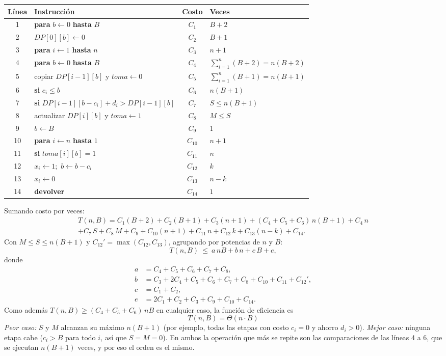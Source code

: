 \documentclass[11pt,a4paper]{article}
\theoremstyle{definition}
\begin{document}
\begin{center}
\small
\begin{tabular}{@{}clcl@{}}
\toprule
Línea & Instrucción & Costo & Veces\\
\midrule
1 & \textbf{para} $b\gets 0$ \textbf{hasta} $B$ & $C_1$ & $B+2$\\
2 & $DP[0][b]\gets 0$ & $C_2$ & $B+1$\\
3 & \textbf{para} $i\gets 1$ \textbf{hasta} $n$ & $C_3$ & $n+1$\\
4 & \textbf{para} $b\gets 0$ \textbf{hasta} $B$ & $C_4$ & $\sum_{i=1}^{n}(B+2)=n(B+2)$\\
5 & copiar $DP[i-1][b]$ y $toma\gets 0$ & $C_5$ & $\sum_{i=1}^{n}(B+1)=n(B+1)$\\
6 & \textbf{si} $c_i\le b$ & $C_6$ & $n(B+1)$\\
7 & \textbf{si} $DP[i-1][b-c_i]+d_i>DP[i-1][b]$ & $C_7$ & $S\le n(B+1)$\\
8 & actualizar $DP[i][b]$ y $toma\gets 1$ & $C_8$ & $M\le S$\\
9 & $b\gets B$ & $C_9$ & $1$\\
10 & \textbf{para} $i\gets n$ \textbf{hasta} $1$ & $C_{10}$ & $n+1$\\
11 & \textbf{si} $toma[i][b]=1$ & $C_{11}$ & $n$\\
12 & $x_i\gets 1$;\ $b\gets b-c_i$ & $C_{12}$ & $k$\\
13 & $x_i\gets 0$ & $C_{13}$ & $n-k$\\
14 & \textbf{devolver} & $C_{14}$ & $1$\\
\bottomrule
\end{tabular}
\end{center}

Sumando costo por veces:
\begin{multline*}
T(n,B)=C_1(B+2)+C_2(B+1)+C_3(n+1)+(C_4+C_5+C_6)\,n(B+1)+C_4\,n\\
+C_7\,S+C_8\,M+C_9+C_{10}(n+1)+C_{11}\,n+C_{12}\,k+C_{13}(n-k)+C_{14}.
\end{multline*}
Con $M\le S\le n(B+1)$ y $C_{12}'=\max(C_{12},C_{13})$, agrupando por potencias de $n$ y $B$:
\[
T(n,B)\ \le\ a\,nB+b\,n+c\,B+e,
\]
donde
\begin{align*}
a&=C_4+C_5+C_6+C_7+C_8,\\
b&=C_3+2C_4+C_5+C_6+C_7+C_8+C_{10}+C_{11}+C_{12}',\\
c&=C_1+C_2,\\
e&=2C_1+C_2+C_3+C_9+C_{10}+C_{14}.
\end{align*}
Como además $T(n,B)\ge (C_4+C_5+C_6)\,nB$ en cualquier caso, la función de eficiencia es
\[
\boxed{T(n,B)=\Theta(n\cdot B)}
\]
\emph{Peor caso:} $S$ y $M$ alcanzan su máximo $n(B+1)$ (por ejemplo, todas las etapas con costo $c_i=0$ y ahorro $d_i>0$). \emph{Mejor caso:} ninguna etapa cabe ($c_i>B$ para todo $i$, así que $S=M=0$). En ambos la operación que más se repite son las comparaciones de las líneas 4 a 6, que se ejecutan $n(B+1)$ veces, y por eso el orden es el mismo.
\end{document}
